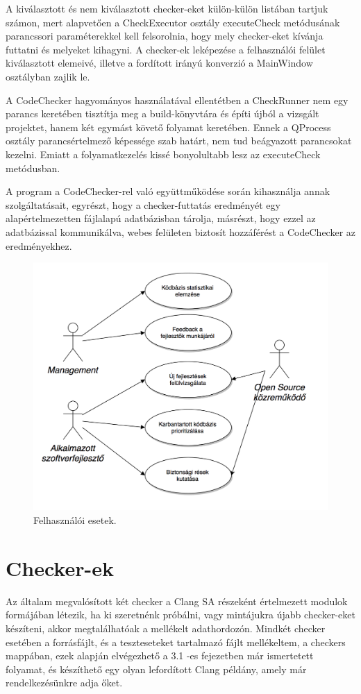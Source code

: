 \documentclass[a4paper,12pt]{report}
\begin{document}
A kiválasztott és nem kiválasztott checker-eket külön-külön listában tartjuk számon, mert alapvetően a CheckExecutor osztály executeCheck metódusának parancssori paraméterekkel kell felsorolnia, hogy mely checker-eket kívánja futtatni és melyeket kihagyni. A checker-ek leképezése a felhasználói felület kiválasztott elemeivé, illetve a fordított irányú konverzió a MainWindow osztályban zajlik le.

A CodeChecker hagyományos használatával ellentétben a CheckRunner nem egy parancs keretében tisztítja meg a build-könyvtára és építi újból a vizsgált projektet, hanem két egymást követő folyamat keretében. Ennek a QProcess osztály parancsértelmező képessége szab határt, nem tud beágyazott parancsokat kezelni. Emiatt a folyamatkezelés kissé bonyolultabb lesz az executeCheck metódusban.

A program a CodeChecker-rel való együttműködése során kihasználja  annak szolgáltatásait, egyrészt, hogy a checker-futtatás eredményét egy alapértelmezetten fájlalapú adatbázisban tárolja, másrészt, hogy ezzel az adatbázissal kommunikálva, webes felületen biztosít hozzáférést a CodeChecker az eredményekhez.

\begin{figure}[h]
\caption{Felhasználói esetek.}
\centering
\includegraphics[scale=0.7]{felhasznaloi.png}
\end{figure}

\section{Checker-ek}
Az általam megvalósított két checker a Clang SA részeként értelmezett modulok formájában létezik, ha ki szeretnénk próbálni, vagy mintájukra újabb checker-eket készíteni, akkor megtalálhatóak a mellékelt adathordozón. Mindkét checker esetében a forrásfájlt, és a teszteseteket tartalmazó fájlt mellékeltem, a checkers mappában, ezek alapján elvégezhető a 3.1 -es fejezetben már ismertetett folyamat, és készíthető egy olyan lefordított Clang példány, amely már rendelkezésünkre adja őket.
\end{document}

